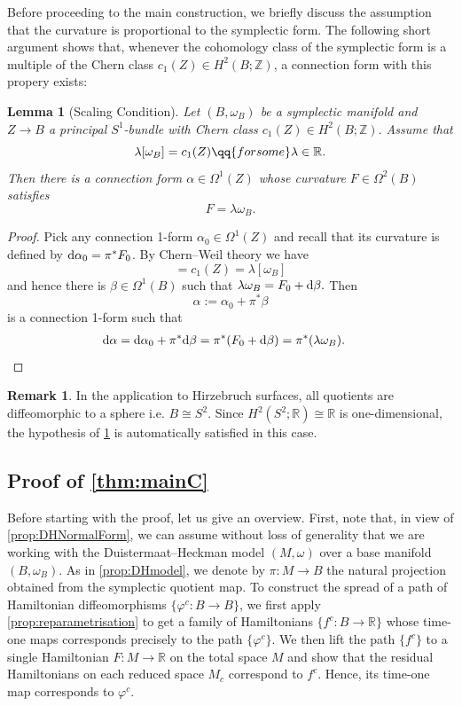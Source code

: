 \documentclass[10pt,oneside,reqno]{amsart}
\newtheorem{lemma}[theorem]{Lemma}
\theoremstyle{definition}
\newtheorem*{remark}{Remark}
\renewcommand{\dd}{\textup{d}}
\newcommand{\IR}{\mathbb{R}}
\newcommand{\IZ}{\mathbb{Z}}
\begin{document}
Before proceeding to the main construction, we briefly discuss the assumption that the curvature is proportional to the symplectic form. The following short argument shows that, whenever the cohomology class of the symplectic form is a multiple of the Chern class $c_1(Z)\in H^2(B;\IZ)$, a connection form with this propery exists:
\begin{lemma}[Scaling Condition]\label{lem:prequantization}
    Let $(B,\omega_B)$ be a symplectic manifold and $Z\to B$ a principal $S^1$-bundle with Chern class $c_1(Z)\in H^2(B;\IZ).$ Assume that $$\lambda [\omega_B] = c_1(Z) \qq{for some} \lambda \in \IR.$$ Then there is a connection form $\alpha\in \Omega^1(Z)$ whose curvature $F\in \Omega^2(B)$ satisfies $$F=\lambda \omega_B.$$
\end{lemma}
\begin{proof}
    Pick any connection 1-form $\alpha_0\in \Omega^1(Z)$ and recall that its curvature is defined by $\dd \alpha_0 = \pi^*F_0$. By Chern--Weil theory we have 
    \begin{equation*}
        [F_0]= c_1(Z) = \lambda [\omega_B]
    \end{equation*} and hence there is $\beta\in \Omega^1(B)$ such that $\lambda \omega_B = F_0 +\dd \beta.$ Then 
    \begin{equation*}
        \alpha:= \alpha_0 +\pi^* \beta
    \end{equation*}
    is a connection 1-form such that
    \begin{align*}
        \dd \alpha &= \dd \alpha_0 + \pi^* \dd \beta = \pi^*(F_0 + \dd \beta) = \pi^*(\lambda \omega_B). \qedhere
    \end{align*}
\end{proof}
\begin{remark}
    In the application to Hirzebruch surfaces, all quotients are diffeomorphic to a sphere i.e. $B\cong S^2$. Since $H^2(S^2;\IR)\cong \IR$ is one-dimensional, the hypothesis of \cref{lem:prequantization} is automatically satisfied in this case. 
\end{remark}



\subsection{Proof of \cref{thm:mainC}}
Before starting with the proof, let us give an overview. First, note that, in view of \cref{prop:DHNormalForm}, we can assume without loss of generality that we are working with the Duistermaat--Heckman model $(M,\omega)$ over a base manifold $(B,\omega_B)$. As in \cref{prop:DHmodel}, we denote by $\pi \colon M \rightarrow B$ the natural projection obtained from the symplectic quotient map. To construct the spread of a path of Hamiltonian diffeomorphisms $\{\varphi^c:B\to B\}$, we first apply \cref{prop:reparametrisation} to get a family of Hamiltonians $\{f^c:B\to \IR\}$ whose time-one maps corresponds precisely to the path $\{\varphi^c\}$. We then lift the path $\{f^c\}$ to a single Hamiltonian $F:M\to \IR$ on the total space $M$ and show that the residual Hamiltonians on each reduced space $M_c$ correspond to $f^c$. Hence, its time-one map corresponds to $\varphi^c$. 
\end{document}
